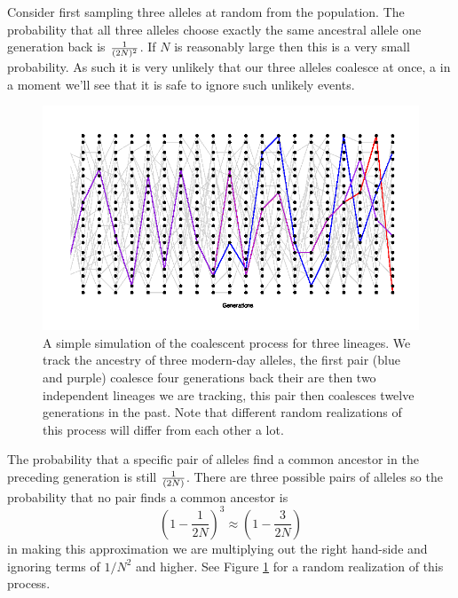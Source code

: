 Consider first sampling three alleles at random from the population. The
probability that all three alleles choose exactly the same ancestral allele one
generation back is $\nicefrac{1}{(2N)^2}$. If $N$ is reasonably large then this
is a very small probability. As such it is very unlikely that our three alleles
coalesce at once, a in a moment we'll see that it is safe to ignore such
unlikely events. \\

\begin{figure}
\begin{center}
  \includegraphics[width = \textwidth]{figures/Coalescent_3.png}
\end{center}
\caption{A simple simulation of the coalescent process for three
  lineages. We track the ancestry of 
  three modern-day alleles, the first pair (blue and purple) coalesce four generations back 
  their are then two independent lineages we are tracking, this pair
  then coalesces twelve generations in the past. Note that different
  random realizations of this process will differ from each other a lot.} \label{fig:Coalescent_simulation_3}
\end{figure}

The probability that a specific pair of alleles find a common ancestor in the
preceding generation is still $\nicefrac{1}{(2N)}$. There are three possible pairs of
alleles so the probability that no pair finds a common ancestor is
\begin{equation}
\left(1-\frac{1}{2N} \right)^3 \approx \left( 1- \frac{3}{2N} \right)
\end{equation}
in making this approximation we are multiplying out the right hand-side
and ignoring terms of $1/N^2$ and higher. See
Figure \ref{fig:Coalescent_simulation_3} for a random realization of this process. \\

